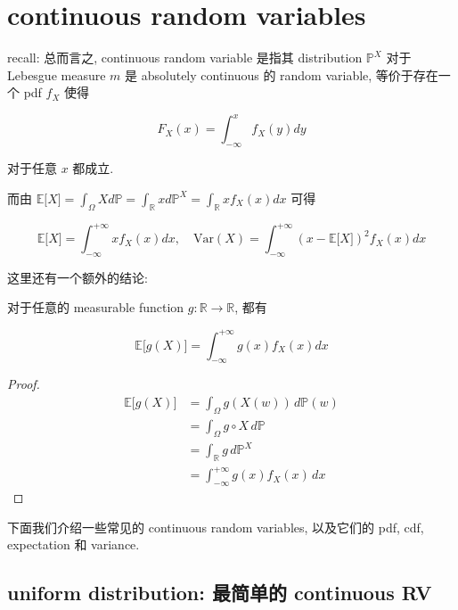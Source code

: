 \documentclass{qlnotes-export}
\begin{document}
\section{continuous random variables}\label{continuous-random-variables}

recall: 总而言之, continuous random variable 是指其 distribution \({\mathbb{P}}^{X}\) 对于 Lebesgue measure \(m\) 是 absolutely continuous 的 random variable, 等价于存在一个 pdf \(f_{X}\) 使得

\[F_{X}(x) = \int_{- \infty}^{x}f_{X}(y)dy\]

对于任意 \(x\) 都成立.

而由 \({\mathbb{E}}\lbrack X\rbrack = \int_{\Omega}Xd{\mathbb{P}} = \int_{\mathbb{R}}xd{\mathbb{P}}^{X} = \int_{\mathbb{R}}xf_{X}(x)dx\) 可得

\[{\mathbb{E}}\lbrack X\rbrack = \int_{- \infty}^{+ \infty}xf_{X}(x)dx,\quad\text{Var}(X) = \int_{- \infty}^{+ \infty}(x - {\mathbb{E}}\lbrack X\rbrack)^{2}f_{X}(x)dx\]

这里还有一个额外的结论:

\begin{proposition}\label{prop-02-random-variables-proposition-014}

对于任意的 measurable function \(g:{\mathbb{R}}\rightarrow{\mathbb{R}}\), 都有

\[{\mathbb{E}}\lbrack g(X)\rbrack = \int_{- \infty}^{+ \infty}g(x)f_{X}(x)dx\]

\end{proposition}

\begin{proof}

\[\begin{matrix}
{{\mathbb{E}}\lbrack g(X)\rbrack} & {= \int_{\Omega}g(X(w))\, d{\mathbb{P}}(w)} \\
 & {= \int_{\Omega}g \circ X\, d{\mathbb{P}}} \\
 & {= \int_{\mathbb{R}}g\, d{\mathbb{P}}^{X}} \\
 & {= \int_{- \infty}^{+ \infty}g(x)f_{X}(x)\, dx}
\end{matrix}\]

\end{proof}

下面我们介绍一些常见的 continuous random variables, 以及它们的 pdf, cdf, expectation 和 variance.

\subsection{uniform distribution: 最简单的 continuous RV}\label{uniform-distribution-ux6700ux7b80ux5355ux7684-continuous-rv}
\end{document}
